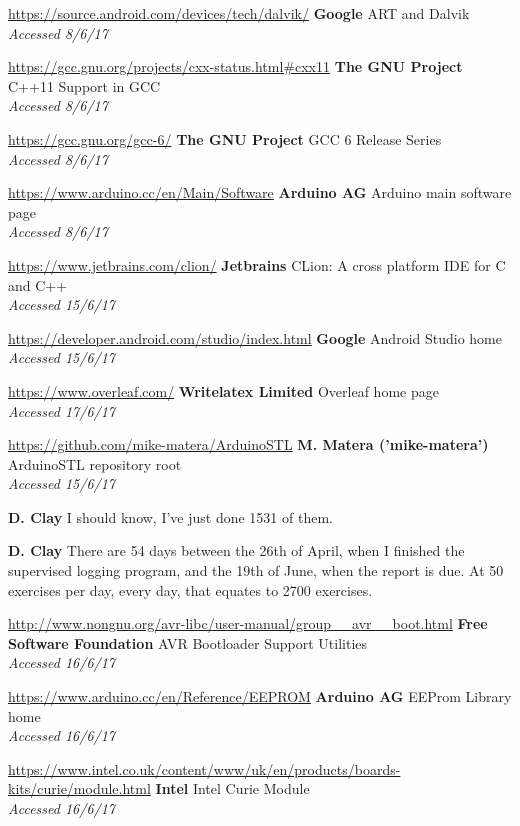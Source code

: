 \documentclass[a4paper]{article}
\begin{document}
\begin{thebibliography}{9}
\url{https://source.android.com/devices/tech/dalvik/}
\textbf{Google}
ART and Dalvik
\\\textit{Accessed 8/6/17}

\url{https://gcc.gnu.org/projects/cxx-status.html#cxx11}
\textbf{The GNU Project}
C++11 Support in GCC
\\\textit{Accessed 8/6/17}

\url{https://gcc.gnu.org/gcc-6/}
\textbf{The GNU Project}
GCC 6 Release Series
\\\textit{Accessed 8/6/17}

\url{https://www.arduino.cc/en/Main/Software}
\textbf{Arduino AG}
Arduino main software page
\\\textit{Accessed 8/6/17}

\url{https://www.jetbrains.com/clion/}
\textbf{Jetbrains}
CLion: A cross platform IDE for C and C++
\\\textit{Accessed 15/6/17}

\url{https://developer.android.com/studio/index.html}
\textbf{Google}
Android Studio home
\\\textit{Accessed 15/6/17}

\url{https://www.overleaf.com/}
\textbf{Writelatex Limited}
Overleaf home page
\\\textit{Accessed 17/6/17}


\url{https://github.com/mike-matera/ArduinoSTL}
\textbf{M. Matera ('mike-matera')}
ArduinoSTL repository root
\\\textit{Accessed 15/6/17}

\textbf{D. Clay}
I should know, I've just done 1531 of them.

\textbf{D. Clay}
There are 54 days between the 26th of April, when I finished the supervised logging program, and the 19th of June, when the report is due. At 50 exercises per day, every day, that equates to 2700 exercises.


\url{http://www.nongnu.org/avr-libc/user-manual/group__avr__boot.html}
\textbf{Free Software Foundation}
AVR Bootloader Support Utilities
\\\textit{Accessed 16/6/17}

\url{https://www.arduino.cc/en/Reference/EEPROM}
\textbf{Arduino AG}
EEProm Library home
\\\textit{Accessed 16/6/17}

\url{https://www.intel.co.uk/content/www/uk/en/products/boards-kits/curie/module.html}
\textbf{Intel}
Intel Curie Module
\\\textit{Accessed 16/6/17}

\end{thebibliography}
\end{document}
